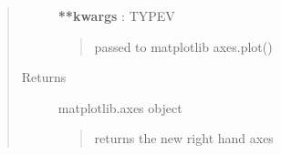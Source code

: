 \documentclass[letterpaper,10pt,english]{sphinxmanual}
\begin{document}
\begin{fulllineitems}
\begin{quote}
\begin{description}
\textbf{**kwargs} : TYPEV
\begin{quote}

passed to matplotlib axes.plot()
\end{quote}

\item[{Returns}] \leavevmode
matplotlib.axes object
\begin{quote}

returns the new right hand axes
\end{quote}

\end{description}\end{quote}

\end{fulllineitems}

\end{document}
